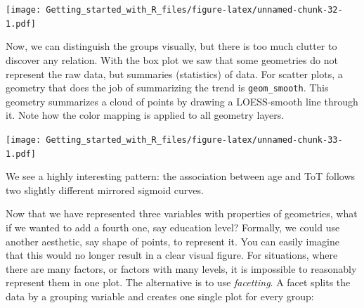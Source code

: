 \documentclass[]{svmono}
\newenvironment{Shaded}{\begin{snugshade}}{\end{snugshade}}
\newcommand{\KeywordTok}[1]{\textcolor[rgb]{0.13,0.29,0.53}{\textbf{#1}}}
\newcommand{\DataTypeTok}[1]{\textcolor[rgb]{0.13,0.29,0.53}{#1}}
\newcommand{\StringTok}[1]{\textcolor[rgb]{0.31,0.60,0.02}{#1}}
\newcommand{\OperatorTok}[1]{\textcolor[rgb]{0.81,0.36,0.00}{\textbf{#1}}}
\newcommand{\NormalTok}[1]{#1}
\theoremstyle{definition}
\theoremstyle{definition}
\theoremstyle{definition}
\theoremstyle{remark}
\begin{document}
\texttt{[image: Getting\_started\_with\_R\_files/figure-latex/unnamed-chunk-32-1.pdf]}

Now, we can distinguish the groups visually, but there is too much
clutter to discover any relation. With the box plot we saw that some
geometries do not represent the raw data, but summaries (statistics) of
data. For scatter plots, a geometry that does the job of summarizing the
trend is \texttt{geom\_smooth}. This geometry summarizes a cloud of
points by drawing a LOESS-smooth line through it. Note how the color
mapping is applied to all geometry layers.

\begin{Shaded}
\end{Shaded}

\texttt{[image: Getting\_started\_with\_R\_files/figure-latex/unnamed-chunk-33-1.pdf]}

We see a highly interesting pattern: the association between age and ToT
follows two slightly different mirrored sigmoid curves.

Now that we have represented three variables with properties of
geometries, what if we wanted to add a fourth one, say education level?
Formally, we could use another aesthetic, say shape of points, to
represent it. You can easily imagine that this would no longer result in
a clear visual figure. For situations, where there are many factors, or
factors with many levels, it is impossible to reasonably represent them
in one plot. The alternative is to use \emph{facetting}. A facet splits
the data by a grouping variable and creates one single plot for every
group:

\begin{Shaded}
\end{Shaded}
\end{document}
